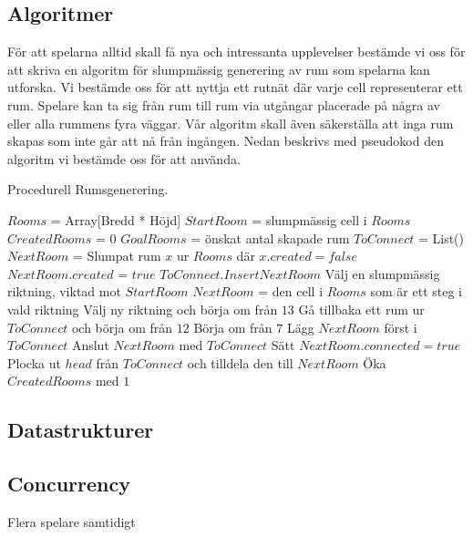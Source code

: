 \documentclass[a4paper]{article}
\begin{document}
\subsection{Algoritmer}
För att spelarna alltid skall få  nya och intressanta upplevelser bestämde vi oss för att skriva en algoritm för slumpmässig generering av rum som spelarna kan utforska. Vi
bestämde oss för att nyttja ett rutnät där varje cell representerar ett rum. Spelare kan ta sig från rum till rum via utgångar placerade på några av eller alla rummens fyra väggar.
Vår algoritm skall även säkerställa att inga rum skapas som inte går att nå från ingången. Nedan beskrivs med pseudokod den algoritm vi bestämde oss för att använda.
\begin{algorithm}
\caption{Procedurell Rumsgenerering.}
\label{alg:RoomGen}
\begin{algorithmic}[1]
\State  $Rooms$ = Array[Bredd * Höjd]
\State  $StartRoom$ = slumpmässig cell i $Rooms$
\State  $CreatedRooms$ = $0$
\State  $GoalRooms$ = önskat antal skapade rum
\Repeat
\State $ToConnect$ = List()
\State $NextRoom$  =  Slumpat rum $x$ ur $Rooms$ där $x.created = false$
\State $NextRoom.created$ = $true$
\State $ToConnect.Insert NextRoom$
\State Välj en slumpmässig riktning, viktad mot $StartRoom$
\State $NextRoom$ = den cell i $Rooms$ som är ett steg i vald riktning
\State Välj ny riktning och börja om från $13$
\State Gå tillbaka ett rum ur $ToConnect$ och börja om från $12$
\State Börja om från $7$
\EndIf
\EndIf
{}
\State Lägg $NextRoom$ först i $ToConnect$
\EndIf
\EndWhile
{}
\State Anslut $NextRoom$ med $ToConnect$
\State Sätt $NextRoom.connected = true$
\State Plocka ut $head$ från $ToConnect$ och tilldela den till $NextRoom$
\State Öka $CreatedRooms$ med $1$
\EndWhile
{}
\EndFunction
\end{algorithmic}

\end{algorithm}

\subsection{Datastrukturer}

\subsection{Concurrency}
Flera spelare samtidigt
\end{document}

